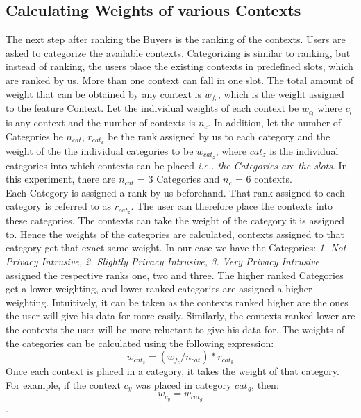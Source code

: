 \subsection{Calculating Weights of various Contexts}
The next step after ranking the Buyers is the ranking of the contexts. Users are asked to categorize the available contexts. Categorizing is similar to ranking, but instead of ranking, the users
place the existing contexts in predefined slots, which are ranked by us. More than one context can fall in one slot. The total amount of weight that can be 
obtained by any context is $w_{f_{c}}$, which is the weight assigned to the feature Context. Let the individual weights of each context be $w_{c_{l}}$ where $c_l$ is any context and the number of contexts is $n_c$. In addition, let the number of Categories be $n_{cat}$, $r_{cat_{k}}$ be the rank assigned by us to
each category and the weight
of the the individual categories to be $w_{cat_{z}}$, where $cat_z$ is the individual categories into which contexts can be placed {\it i.e.. the Categories are the slots}. In this experiment, there are $n_{cat}$ = 3 Categories
and $n_c$ = 6 contexts.\\
Each Category is assigned a rank by us beforehand. That rank assigned to each category is referred to as $r_{cat_{z}}$. The user can therefore place the contexts into these categories. The contexts can take the weight of the
category it is assigned to.
Hence the weights of the categories are calculated, contexts assigned to that category get that exact same weight. In our case we have the Categories: {\it 1. Not Privacy Intrusive, 2. Slightly Privacy Intrusive, 3. Very
Privacy Intrusive} assigned the respective ranks one, two and three.
The higher ranked Categories get a lower weighting, and lower ranked categories are assigned a higher weighting. Intuitively, it can be taken as the contexts ranked higher are the ones the user will give his data for
more easily. Similarly, the contexts ranked lower are the contexts the user will be more reluctant to give his data for. The weights of the categories can be calculated using the following expression:
$$w_{cat_{z}} = (w_{f_{c}}/n_{cat})*r_{cat_{k}}$$
Once each context is placed in a category, it takes the weight of that category. For example, if the context $c_y$ was placed in category $cat_g$, then:
$$w_{c_{y}} = w_{cat_{g}}$$.

